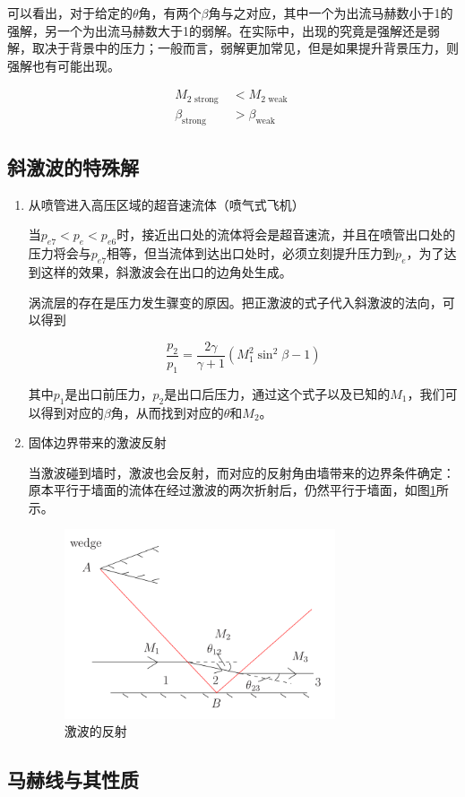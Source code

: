 可以看出，对于给定的$\theta$角，有两个$\beta$角与之对应，其中一个为出流马赫数小于1的强解，另一个为出流马赫数大于1的弱解。在实际中，出现的究竟是强解还是弱解，取决于背景中的压力；一般而言，弱解更加常见，但是如果提升背景压力，则强解也有可能出现。

\begin{align*}
    M_{2 \text { strong }}&<M_{2 \text { weak }}\\ 
    \beta_{\text {strong }}&>\beta_{\text {weak }}
\end{align*}

\subsection{斜激波的特殊解}

\begin{enumerate}
    \item 从喷管进入高压区域的超音速流体（喷气式飞机）
    
    当$p_{e7}<p_e<p_{e6}$时，接近出口处的流体将会是超音速流，并且在喷管出口处的压力将会与$p_{e7}$相等，但当流体到达出口处时，必须立刻提升压力到$p_e$，为了达到这样的效果，斜激波会在出口的边角处生成。

    涡流层的存在是压力发生骤变的原因。把正激波的式子代入斜激波的法向，可以得到

    \begin{equation*}
        \frac{p_{2}}{p_{1}}=\frac{2 \gamma}{\gamma+1}\left(M_{1}^{2} \sin ^{2} \beta-1\right)
    \end{equation*}

    其中$p_1$是出口前压力，$p_2$是出口后压力，通过这个式子以及已知的$M_1$，我们可以得到对应的$\beta$角，从而找到对应的$\theta$和$M_2$。

    \item 固体边界带来的激波反射
    
    当激波碰到墙时，激波也会反射，而对应的反射角由墙带来的边界条件确定：原本平行于墙面的流体在经过激波的两次折射后，仍然平行于墙面，如图\ref{9}所示。

    \begin{figure}[!ht]
        \centering
        \includegraphics[width=8cm]{figures/9.png}
        \caption{激波的反射}
        \label{9}
    \end{figure}
\end{enumerate}

\subsection{马赫线与其性质}

